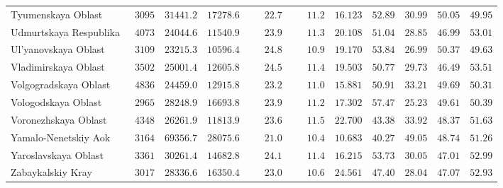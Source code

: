 \documentclass[alpha-refs]{wiley-article-03v}
\begin{document}
{\begin{longtable}{lcccccccccc}
		Tyumenskaya Oblast  & $\phantom{0}3095$ & $31441.2$ & $17278.6$ & $\phantom{000}22.7$ & $\phantom{000}11.2$ & $16.123$ & $52.89$ & $30.99$ & $50.05$ & $49.95$ \\
		Udmurtskaya Respublika  & $\phantom{0}4073$ & $24044.6$ & $11540.9$ & $\phantom{000}23.9$ & $\phantom{000}11.3$ & $20.108$ & $51.04$ & $28.85$ & $46.99$ & $53.01$ \\
		Ul'yanovskaya Oblast  & $\phantom{0}3109$ & $23215.3$ & $10596.4$ & $\phantom{000}24.8$ & $\phantom{000}10.9$ & $19.170$ & $53.84$ & $26.99$ & $50.37$ & $49.63$ \\
		Vladimirskaya Oblast  & $\phantom{0}3502$ & $25001.4$ & $12605.8$ & $\phantom{000}24.5$ & $\phantom{000}11.4$ & $19.503$ & $50.77$ & $29.73$ & $46.49$ & $53.51$ \\
		Volgogradskaya Oblast  & $\phantom{0}4836$ & $24459.0$ & $12915.8$ & $\phantom{000}23.2$ & $\phantom{000}11.0$ & $15.881$ & $50.91$ & $33.21$ & $49.69$ & $50.31$ \\
		Vologodskaya Oblast  & $\phantom{0}2965$ & $28248.9$ & $16693.8$ & $\phantom{000}23.9$ & $\phantom{000}11.2$ & $17.302$ & $57.47$ & $25.23$ & $49.61$ & $50.39$ \\
		Voronezhskaya Oblast  & $\phantom{0}4348$ & $26261.9$ & $11813.9$ & $\phantom{000}23.6$ & $\phantom{000}11.5$ & $22.700$ & $43.38$ & $33.92$ & $48.37$ & $51.63$ \\
		Yamalo-Nenetskiy Aok  & $\phantom{0}3164$ & $69356.7$ & $28075.6$ & $\phantom{000}21.0$ & $\phantom{000}10.4$ & $10.683$ & $40.27$ & $49.05$ & $48.74$ & $51.26$ \\
		Yaroslavskaya Oblast  & $\phantom{0}3361$ & $30261.4$ & $14682.8$ & $\phantom{000}24.1$ & $\phantom{000}11.4$ & $16.215$ & $53.73$ & $30.05$ & $47.01$ & $52.99$ \\
		Zabaykalskiy Kray  & $\phantom{0}3017$ & $28336.6$ & $16350.4$ & $\phantom{000}23.0$ & $\phantom{000}10.6$ & $24.561$ & $47.40$ & $28.04$ & $47.07$ & $52.93$ \\
		\hline 
	\end{longtable}
}
\end{document}
